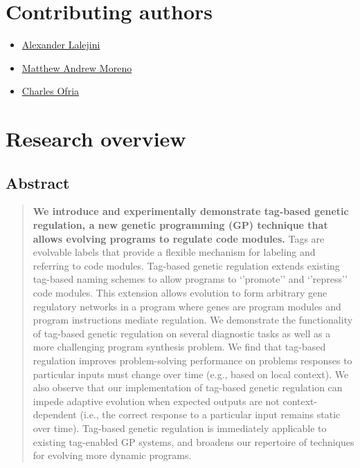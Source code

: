 \documentclass[
]{book}
\providecommand{\tightlist}{%
  \setlength{\itemsep}{0pt}\setlength{\parskip}{0pt}}
\begin{document}
\hypertarget{contributing-authors}{%
\section{Contributing authors}\label{contributing-authors}}

\begin{itemize}
\tightlist
\item
  \href{https://lalejini.com/}{Alexander Lalejini}
\item
  \href{http://mmore500.com/}{Matthew Andrew Moreno}
\item
  \href{https://ofria.com/}{Charles Ofria}
\end{itemize}

\hypertarget{research-overview}{%
\section{Research overview}\label{research-overview}}

\hypertarget{abstract}{%
\subsection{Abstract}\label{abstract}}

\begin{quote}
\textbf{We introduce and experimentally demonstrate tag-based genetic regulation, a new genetic programming (GP) technique that allows evolving programs to regulate code modules.}
Tags are evolvable labels that provide a flexible mechanism for labeling and referring to code modules.
Tag-based genetic regulation extends existing tag-based naming schemes to allow programs to `'promote'' and `'repress'' code modules.
This extension allows evolution to form arbitrary gene regulatory networks in a program where genes are program modules and program instructions mediate regulation.
We demonstrate the functionality of tag-based genetic regulation on several diagnostic tasks as well as a more challenging program synthesis problem.
We find that tag-based regulation improves problem-solving performance on problems responses to particular inputs must change over time (e.g., based on local context).
We also observe that our implementation of tag-based genetic regulation can impede adaptive evolution when expected outputs are not context-dependent (i.e., the correct response to a particular input remains static over time).
Tag-based genetic regulation is immediately applicable to existing tag-enabled GP systems, and broadens our repertoire of techniques for evolving more dynamic programs.
\end{quote}
\end{document}
